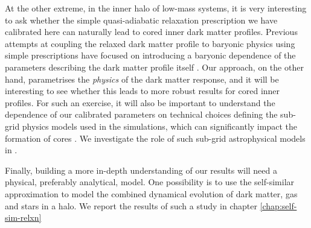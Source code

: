 At the other extreme, in the inner halo of low-mass systems, it is very interesting to ask whether the simple quasi-adiabatic relaxation prescription we have calibrated here can naturally lead to cored inner dark matter profiles. Previous attempts at coupling the relaxed dark matter profile to baryonic physics using simple prescriptions have focused on introducing a baryonic dependence of the parameters describing the dark matter profile itself \citep[e.g.,][]{2014MNRAS.441.2986D}. Our approach, on the other hand, parametrises the \emph{physics} of the dark matter response, and it will be interesting to see whether this leads to more robust results for cored inner profiles. For such an exercise, it will also be important to understand the dependence of our calibrated parameters on technical choices defining the sub-grid physics models used in the simulations, which can significantly impact the formation of cores \citep{bfln18}. We investigate the role of such sub-grid astrophysical models in .

Finally, building a more in-depth understanding of our results will need a physical, preferably analytical, model. One possibility is to use the self-similar approximation \citep[][]{fg84,bertschinger85,launagai+15,shi16} to model the combined dynamical evolution of dark matter, gas and stars in a halo. We report the results of such a study in chapter \ref{chap:self-sim-relxn}

 

